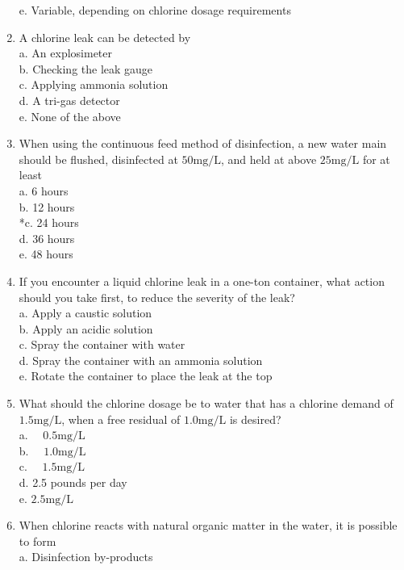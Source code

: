 \begin{enumerate}[1.]
e. Variable, depending on chlorine dosage requirements\\
\item A chlorine leak can be detected by\\
a. An explosimeter\\
b. Checking the leak gauge\\
c. Applying ammonia solution\\
d. A tri-gas detector\\
e. None of the above\\
\item When using the continuous feed method of disinfection, a new water main should be flushed, disinfected at $50 \mathrm{mg} / \mathrm{L}$, and held at above $25 \mathrm{mg} / \mathrm{L}$ for at least\\
a. 6 hours\\
b. 12 hours\\
*c. 24 hours\\
d. 36 hours\\
e. 48 hours\\
\item If you encounter a liquid chlorine leak in a one-ton container, what action should you take first, to reduce the severity of the leak?\\
a. Apply a caustic solution\\
b. Apply an acidic solution\\
c. Spray the container with water\\
d. Spray the container with an ammonia solution\\
e. Rotate the container to place the leak at the top\\
\item What should the chlorine dosage be to water that has a chlorine demand of $1.5 \mathrm{mg} / \mathrm{L}$, when a free residual of $1.0 \mathrm{mg} / \mathrm{L}$ is desired?\\
a. $\quad 0.5 \mathrm{mg} / \mathrm{L}$\\
b. $\quad 1.0 \mathrm{mg} / \mathrm{L}$\\
c. $\quad 1.5 \mathrm{mg} / \mathrm{L}$\\
d. 2.5 pounds per day\\
e. $2.5 \mathrm{mg} / \mathrm{L}$\\
\item When chlorine reacts with natural organic matter in the water, it is possible to form\\
a. Disinfection by-products\\

\end{enumerate}
